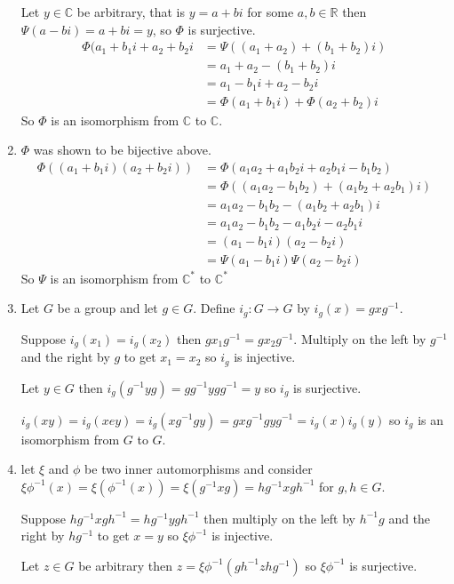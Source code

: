 \documentclass{amsart}
\begin{document}
\begin{enumerate}
    Let $y\in\mathbb{C}$ be arbitrary, that is $y=a+bi$ for some $a,b\in\mathbb{R}$ then $\Psi(a-bi)=a+bi=y$, so $\Phi$ is surjective.
    \begin{align*}
    \Phi(a_1+b_1i+a_2+b_2i&=\Psi((a_1+a_2)+(b_1+b_2)i) \\
    &=a_1+a_2-(b_1+b_2)i \\
    &=a_1-b_1i+a_2-b_2i \\
    &=\Phi(a_1+b_1i)+\Phi(a_2+b_2)i
    \end{align*}
    So $\Phi$ is an isomorphism from $\mathbb{C}$ to $\mathbb{C}$.
    
    \item $\Phi$ was shown to be bijective above.
    \begin{align*}
        \Phi((a_1+b_1i)(a_2+b_2i))&=\Phi(a_1a_2+a_1b_2i+a_2b_1i-b_1b_2) \\
        &=\Phi((a_1a_2-b_1b_2)+(a_1b_2+a_2b_1)i) \\
        &=a_1a_2-b_1b_2-(a_1b_2+a_2b_1)i \\
        &=a_1a_2-b_1b_2-a_1b_2i-a_2b_1i \\
        &=(a_1-b_1i)(a_2-b_2i) \\
        &=\Psi(a_1-b_1i)\Psi(a_2-b_2i)
    \end{align*}
    So $\Psi$ is an isomorphism from $\mathbb{C^*}$ to $\mathbb{C^*}$
    
    \item Let $G$ be a group and let $g\in G$.  Define $i_g:G\to G$ by $i_g(x)=gxg^{-1}$.
    
    Suppose $i_g(x_1)=i_g(x_2)$ then $gx_1g^{-1}=gx_2g^{-1}$.  Multiply on the left by $g^{-1}$ and the right by $g$ to get $x_1=x_2$ so $i_g$ is injective.
    
    Let $y\in G$ then $i_g(g^{-1}yg)=gg^{-1}ygg^{-1}=y$ so $i_g$ is surjective.
    
    $i_g(xy)=i_g(xey)=i_g(xg^{-1}gy)=gxg^{-1}gyg^{-1}=i_g(x)i_g(y)$
    so $i_g$ is an isomorphism from $G$ to $G$.
    
    \item let $\xi$ and $\phi$ be two inner automorphisms and consider $\xi\phi^{-1}(x)=\xi(\phi^{-1}(x))=\xi(g^{-1}xg)=hg^{-1}xgh^{-1}$ for $g,h\in G$.
    
    Suppose $hg^{-1}xgh^{-1}=hg^{-1}ygh^{-1}$ then multiply on the left by $h^{-1}g$ and the right by $hg^{-1}$ to get $x=y$ so $\xi\phi^{-1}$ is injective.
    
    Let $z\in G$ be arbitrary then $z=\xi\phi^{-1}(gh^{-1}zhg^{-1})$ so $\xi\phi^{-1}$ is surjective.
    

\end{enumerate}
\end{document}
